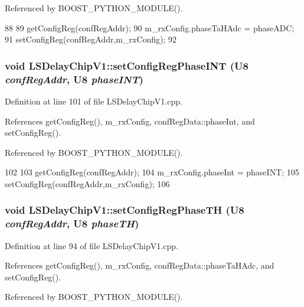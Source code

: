 Referenced by BOOST\_\-PYTHON\_\-MODULE().


\begin{DoxyCode}
88 {
89     getConfigReg(confRegAddr);
90     m_rxConfig.phaseTaHAdc = phaseADC;
91     setConfigReg(confRegAddr,m_rxConfig);
92 }
\end{DoxyCode}
\hypertarget{classLSDelayChipV1_a317f739744d1093385306530fe5b312a}{
\subsubsection[{setConfigRegPhaseINT}]{\setlength{\rightskip}{0pt plus 5cm}void LSDelayChipV1::setConfigRegPhaseINT ({\bf U8} {\em confRegAddr}, \/  {\bf U8} {\em phaseINT})}}
\label{classLSDelayChipV1_a317f739744d1093385306530fe5b312a}


Definition at line 101 of file LSDelayChipV1.cpp.

References getConfigReg(), m\_\-rxConfig, confRegData::phaseInt, and setConfigReg().

Referenced by BOOST\_\-PYTHON\_\-MODULE().


\begin{DoxyCode}
102 {
103     getConfigReg(confRegAddr);
104     m_rxConfig.phaseInt = phaseINT;
105     setConfigReg(confRegAddr,m_rxConfig);
106 }
\end{DoxyCode}
\hypertarget{classLSDelayChipV1_aa1364ef56bf75884756a8d589cee4328}{
\subsubsection[{setConfigRegPhaseTH}]{\setlength{\rightskip}{0pt plus 5cm}void LSDelayChipV1::setConfigRegPhaseTH ({\bf U8} {\em confRegAddr}, \/  {\bf U8} {\em phaseTH})}}
\label{classLSDelayChipV1_aa1364ef56bf75884756a8d589cee4328}


Definition at line 94 of file LSDelayChipV1.cpp.

References getConfigReg(), m\_\-rxConfig, confRegData::phaseTaHAdc, and setConfigReg().

Referenced by BOOST\_\-PYTHON\_\-MODULE().


